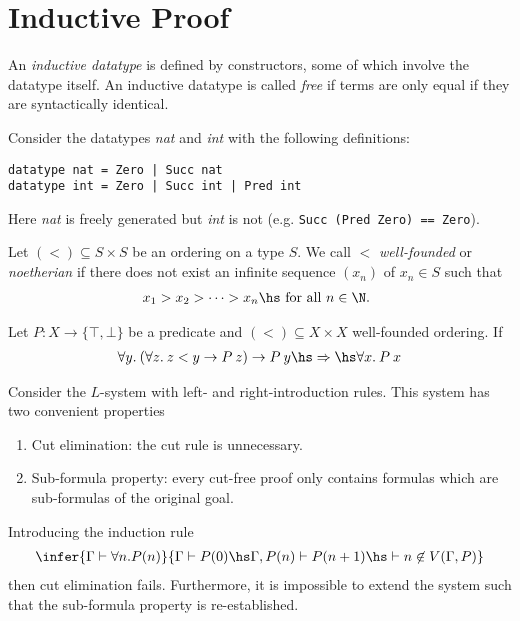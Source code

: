 \documentclass{article}
\begin{document}
\section{Inductive Proof}

\begin{definition}
	An \emph{inductive datatype} is defined by constructors, some of which involve the datatype
	itself. An inductive datatype is called \emph{free} if terms are only equal if they are
	syntactically identical.
\end{definition}

\begin{example}
	Consider the datatypes \emph{nat} and \emph{int} with the following definitions:
	\begin{verbatim}
datatype nat = Zero | Succ nat
datatype int = Zero | Succ int | Pred int
    \end{verbatim}
	Here \emph{nat} is freely generated but \emph{int} is not (e.g. \texttt{Succ (Pred Zero) == Zero}).
\end{example}

\begin{definition}
	Let $(<) \subseteq S\times S$ be an ordering on a type $S$. We call $<$ \emph{well-founded} or
	\emph{noetherian} if there does not exist an infinite sequence $(x_n)$ of $x_n\in S$ such that
	\begin{align*}
		x_1 > x_2 > \cdots > x_n\hs\text{ for all $n\in\N$.  }
	\end{align*}
\end{definition}

\begin{theorem}
	Let $P:X\to\{\top,\bot\}$ be a predicate and $(<)\subseteq X\times X$ well-founded ordering.
	If
	\begin{align*}
		\forall y.\:(\forall z.\:z < y \to P\:z) \to P\:y
		\hs\Rightarrow\hs
		\forall x.\:P\:x
	\end{align*}
\end{theorem}

\begin{theorem}
	Consider the $L$-system with left- and right-introduction rules. This system has two
	convenient properties
	\begin{enumerate}
		\item Cut elimination: the cut rule is unnecessary.
		\item Sub-formula property: every cut-free proof only contains formulas which are sub-formulas of the original goal.
	\end{enumerate}
	Introducing the induction rule
	\begin{align*}
		\infer{\Gamma \vdash \forall n. P(n)}{\Gamma \vdash P(0) \hs \Gamma,P(n)\vdash P(n+1) \hs \vdash n\not\in V(\Gamma, P)}
	\end{align*}
	then cut elimination fails. Furthermore, it is impossible to extend the system such that
	the sub-formula property is re-established.
\end{theorem}
\end{document}
